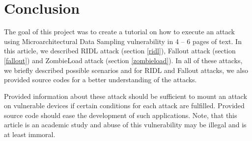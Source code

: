 \documentclass[11pt,a4paper,titlepage]{article}
\begin{document}
            
    \section{Conclusion}
        The goal of this project was to create a tutorial on how to execute an attack using Microarchitectural Data Sampling vulnerability in 4 -- 6 pages of text. In this article, we described RIDL attack (section \ref{ridl}), Fallout attack (section \ref{fallout}) and ZombieLoad attack (section \ref{zombieload}). In all of these attacks, we briefly described possible scenarios and for RIDL and Fallout attacks, we also provided source codes for a better understanding of the attacks.
        
        Provided information about these attack should be sufficient to mount an attack on vulnerable devices if certain conditions for each attack are fulfilled. Provided source code should ease the development of such applications. Note, that this article is an academic study and abuse of this vulnerability may be illegal and is at least immoral.
    
    \newpage
    
\end{document}
